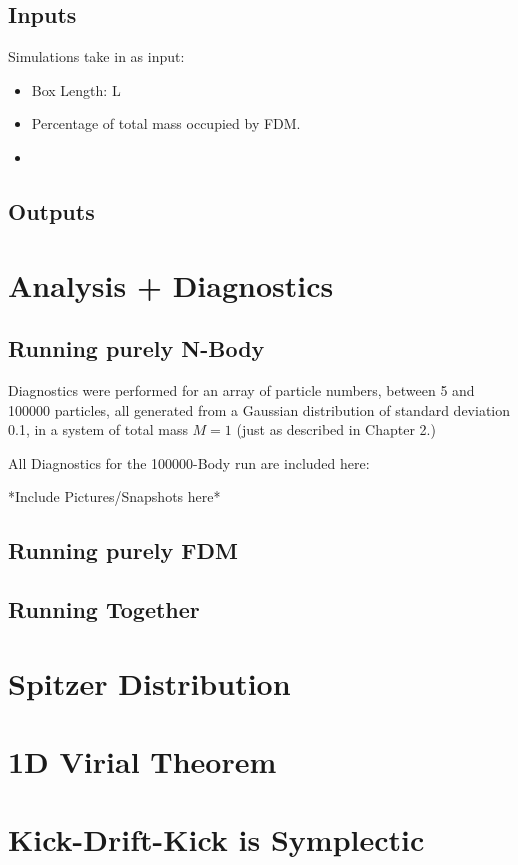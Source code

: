 \documentclass{book}
\begin{document}
\section{Inputs}

Simulations take in as input:
\begin{itemize}
    \item Box Length: L
    \item Percentage of total mass occupied by FDM.
    \item     
\end{itemize}

\section{Outputs}

\chapter{Analysis + Diagnostics}

\section{Running purely N-Body}
Diagnostics were performed for an array of particle numbers, between 5 and 100000 particles, all generated from a Gaussian distribution of standard deviation 0.1, in a system of total mass $M=1$ (just as described in Chapter 2.)

All Diagnostics for the 100000-Body run are included here:

*Include Pictures/Snapshots here*

\section{Running purely FDM}

\section{Running Together}



\appendix
\chapter{Spitzer Distribution}

\chapter{1D Virial Theorem}

\chapter{Kick-Drift-Kick is Symplectic}


\end{document}
